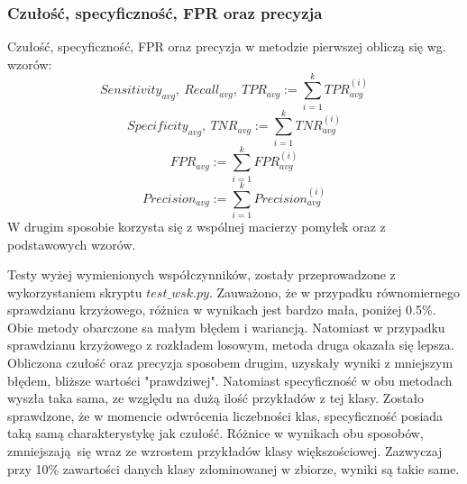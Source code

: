 \subsubsection{Czułość, specyficzność, FPR oraz precyzja}
Czułość, specyficzność, FPR oraz precyzja w metodzie pierwszej obliczą się wg. wzorów:
\[Sensitivity_{avg},\ Recall_{avg},\ TPR_{avg} := \sum_{i=1}^{k} TPR_{avg}^{(i)}\]
\[Specificity_{avg},\ TNR_{avg} := \sum_{i=1}^{k} TNR_{avg}^{(i)}\]
\[FPR_{avg} := \sum_{i=1}^{k} FPR_{avg}^{(i)}\]
\[Precision_{avg} := \sum_{i=1}^{k} Precision_{avg}^{(i)}\]
W drugim sposobie korzysta się z wspólnej macierzy pomyłek oraz z podstawowych wzorów. \par
Testy wyżej wymienionych współczynników, zostały przeprowadzone z wykorzystaniem skryptu $test\_wsk.py$. Zauważono, że w przypadku równomiernego sprawdzianu krzyżowego, różnica w wynikach jest bardzo mała, poniżej 0.5\%. Obie metody obarczone sa małym błędem i wariancją. Natomiast w przypadku sprawdzianu krzyżowego z rozkładem losowym, metoda druga okazała się lepsza. Obliczona czułość oraz precyzja sposobem drugim, uzyskały wyniki z mniejszym błędem, bliższe wartości "prawdziwej". Natomiast specyficzność w obu metodach wyszła taka sama, ze względu na dużą ilość przykładów z tej klasy. Zostało sprawdzone, że w momencie odwrócenia liczebności klas, specyficzność posiada taką samą charakterystykę jak czułość. Różnice w wynikach obu sposobów, zmniejszają się wraz ze wzrostem przykładów klasy większościowej. Zazwyczaj przy 10\% zawartości danych klasy zdominowanej w zbiorze, wyniki są takie same.
